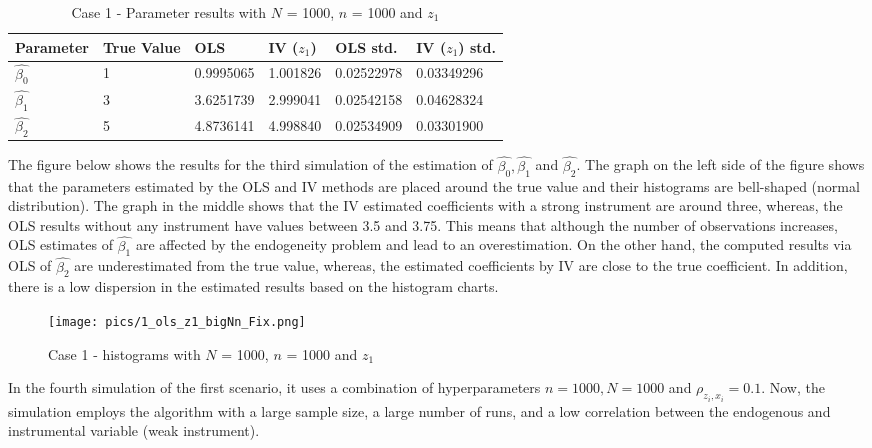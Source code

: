 \documentclass{article}
\begin{document}
\newline
\begin{table}[h!]
\centering
\begin{tabular}{ | m{2cm} | m{2cm}|  m{2cm}| m{2cm}|  m{2cm}| m{2cm}|} 
  \hline
  Parameter & True Value & OLS & IV ($z_{1}$) & OLS std. & IV ($z_{1}$) std.\\ 
  \hline
  $\hat{\beta_{0}}$ & 1 & 0.9995065 & 1.001826 & 0.02522978 & 0.03349296 \\ 
  \hline
  $\hat{\beta_{1}}$ & 3 & 3.6251739 & 2.999041 & 0.02542158 & 0.04628324 \\
  \hline
  $\hat{\beta_{2}}$ & 5 & 4.8736141 & 4.998840 & 0.02534909 & 0.03301900 \\
  \hline
\end{tabular}
\caption{Case 1 - Parameter results with $N$ = 1000, $n$ = 1000 and $z_{1}$}
\label{table:4}
\end{table}
\newline
The figure below shows the results for the third simulation of the estimation of $\hat{\beta_{0}}, \hat{\beta_{1}}$ and $\hat{\beta_{2}}$. The graph on the left side of the figure shows that the parameters estimated by the OLS and IV methods are placed around the true value and their histograms are bell-shaped (normal distribution). The graph in the middle shows that the IV estimated coefficients with a strong instrument are around three, whereas, the OLS results without any instrument have values between 3.5 and 3.75. This means that although the number of observations increases, OLS estimates of $\hat{\beta_{1}}$ are affected by the endogeneity problem and lead to an overestimation. On the other hand, the computed results via OLS of $\hat{\beta_{2}}$ are underestimated from the true value, whereas, the estimated coefficients by IV are close to the true coefficient. In addition, there is a low dispersion in the estimated results based on the histogram charts.
\begin{figure}[h]
\centering
\texttt{[image: pics/1\_ols\_z1\_bigNn\_Fix.png]}
\caption{Case 1 - histograms with $N$ = 1000, $n$ = 1000 and $z_{1}$}
\label{fig:image2}
\end{figure}
\newline
In the fourth simulation of the first scenario, it uses a combination of hyperparameters $n = 1000, N = 1000$ and $\rho_{z_{i},x_{i}} = 0.1$. Now, the simulation employs the algorithm with a large sample size, a large number of runs, and a low correlation between the endogenous and instrumental variable (weak instrument). 
\end{document}
